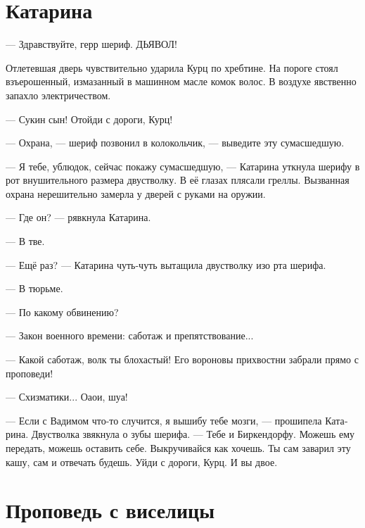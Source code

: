 \documentclass[a4paper,12pt,fleqn]{book}\usepackage{cooltooltips}\usepackage{polyglossia}\setdefaultlanguage[babelshorthands=true]{russian}\setotherlanguage{english}\defaultfontfeatures{Ligatures=TeX,Mapping=tex-text} \usepackage{xcolor}\definecolor{lightgray}{HTML}{bbbbbb}\color{lightgray}\newcommand{\ml}[3]{\textenglish{\textcolor{black}{#3}}}
\begin{document}
\section{Катарина}

--- Здравствуйте, герр шериф.
ДЬЯВОЛ!

Отлетевшая дверь чувствительно ударила Курц по хребтине.
На пороге стоял взъерошенный, измазанный в машинном масле комок волос.
В воздухе явственно запахло электричеством.

--- Сукин сын!
Отойди с дороги, Курц!

--- Охрана, --- шериф позвонил в колокольчик, --- выведите эту сумасшедшую.

--- Я тебе, ублюдок, сейчас покажу сумасшедшую, --- Катарина уткнула шерифу в рот внушительного размера двустволку.
В её глазах плясали греллы.
Вызванная охрана нерешительно замерла у дверей с руками на оружии.

--- Где он? --- рявкнула Катарина.

--- В тве.

--- Ещё раз? --- Катарина чуть-чуть вытащила двустволку изо рта шерифа.

--- В тюрьме.

--- По какому обвинению?

--- Закон военного времени: саботаж и препятствование...

--- Какой саботаж, волк ты блохастый!
Его вороновы прихвостни забрали прямо с проповеди!

--- Схизматики...
Оаои, шуа!

--- Если с Вадимом что-то случится, я вышибу тебе мозги, --- прошипела Катарина.
Двустволка звякнула о зубы шерифа.
--- Тебе и Биркендорфу.
Можешь ему передать, можешь оставить себе.
Выкручивайся как хочешь.
Ты сам заварил эту кашу, сам и отвечать будешь.
Уйди с дороги, Курц.
И вы двое.

\section{Проповедь с виселицы}
\end{document}
